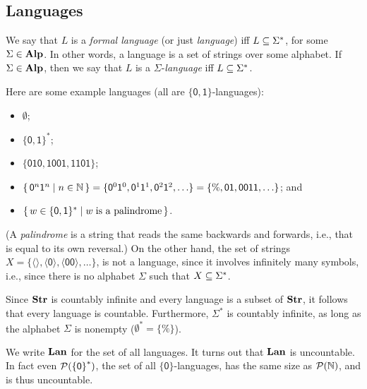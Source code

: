 \subsection{Languages}

%
We say that $L$ is a \emph{formal language}
%
(or just \emph{language}) iff $L\subseteq\Sigma^*$, for some
$\Sigma\in\mathbf{Alp}$.  In other words, a language is a set of strings over
some alphabet.
If $\Sigma\in\mathbf{Alp}$, then we say that $L$ is a
$\Sigma$-\emph{language}
%
%
iff $L\subseteq\Sigma^*$.

Here are some example languages (all are $\mathsf{\{0,1\}}$-languages):
\begin{itemize}
\item $\emptyset$;

\item $\mathsf{\{0,1\}^*}$;

\item $\mathsf{\{010,1001,1101\}}$;

\item $\{ \, \mathsf{0}^n\mathsf{1}^n \mid n\in\mathbb{N} \, \} =
\{\mathsf{0}^0\mathsf{1}^0, \mathsf{0}^1\mathsf{1}^1, \mathsf{0}^2\mathsf{1}^2, \ldots\} =
\mathsf{\{\%, 01, 0011, \ldots\}}$; and

\item $\{ \, w\in\mathsf{\{0,1\}^*} \mid w\;\allowbreak\mbox{is a palindrome}\allowbreak \, \}$.
\end{itemize}
(A \emph{palindrome}
%
%
is a string that reads the same backwards and forwards,
i.e., that is equal to its own reversal.)
On the other hand, the set of strings
$X=\mathsf{\{\langle\rangle, \langle 0\rangle, \langle 00\rangle}, \ldots\}$,
is not a language, since it involves infinitely many symbols, i.e.,
since there is no alphabet $\Sigma$ such that $X\subseteq\Sigma^*$.

Since $\mathbf{Str}$ is countably infinite and every language is a subset
of $\mathbf{Str}$, it follows that every language is countable.
%
Furthermore, $\Sigma^*$ is countably infinite,
%
as long as the alphabet
$\Sigma$ is nonempty ($\emptyset^*=\{\%\}$).

We write $\mathbf{Lan}$
%
%
for the set of all languages.  It turns out that $\mathbf{Lan}$ is
uncountable.
%
In fact even
${\cal P} (\mathsf{\{0\}}^*)$, the set of all
$\mathsf{\{0\}}$-languages, has the same size as ${\cal P} (\mathbb{N})$,
and is thus uncountable.

